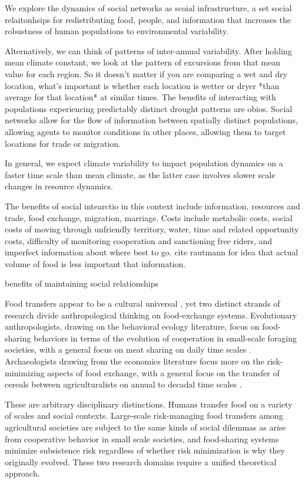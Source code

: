 \documentclass[fleqn,10pt]{wlscirep}
\begin{document}
We explore the dynamics of social networks as scoial infrastructure, a set social relaitonhsips for redistributing food, people, and information that increases the robustness of human populations to environmental variability.


Alternatively, we can think of patterns of inter-annual variability. After holding mean climate constant, we look at the pattern of excursions from that mean value for each region. So it doesn't matter if you are comparing a wet and dry location, what's important is whether each location is wetter or dryer *than average for that location* at similar times. The benefits of interacting with populations experiencing predictably distinct drought patterns are obios. Social networks allow for the flow of information between spatially distinct populations, allowing agents to monitor conditions in other places, allowing them to target locations for trade or migration.

In general, we expect climate variability to impact population dynamics on a faster time scale than mean climate, as the latter case involves slower scale changes in resource dynamics.

The benefits of social intearctio in this context include information, resources and trade, food exchange, migration, marriage. Costs include metabolic costs, social costs of moving through unfriendly territory, water, time and related opportunity costs, difficulty of monitoring cooperation and sanctioning free riders, and imperfect information about where best to go. cite rautmann for idea that actual volume of food is less important that information.

benefits of maintaining social relationships

Food transfers appear to be a cultural universal \cite{Fe2001,Hill2011Co-ResidenceStructure}, yet two distinct strands of research divide anthropological thinking on food-exchange systems. Evolutionary anthropologists, drawing on the behavioral ecology literature, focus on food-sharing behaviors in terms of the evolution of cooperation in small-scale foraging societies, with a general focus on meat sharing on daily time scales \cite{Gurven2000,Ziker2005, Hames2007, Allen-Arave2008}.  Archaeologists drawing from the economics literature focus more on the risk-minimizing aspects of food exchange, with a general focus on the transfer of cereals between agriculturalists on annual to decadal time scales \cite{Gallant1989,Garnsey1989,Rautman1993a,Hegmon1996}.

These are arbitrary disciplinary distinctions. Humans transfer food on a variety of scales and social contexts. Large-scale risk-managing food transfers among agricultural societies are subject to the same kinds of social dilemmas as arise from cooperative behavior in small scale societies, and food-sharing systems minimize subsistence risk regardless of whether risk minimization is why they originally evolved. These two research domains require a unified theoretical approach.
\end{document}
